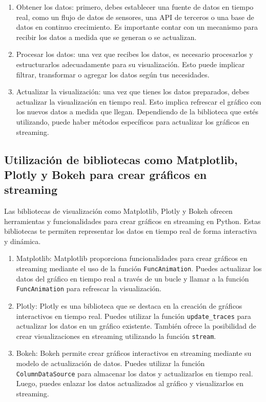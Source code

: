 \documentclass[
  a4paper,
]{article}
\begin{document}
\begin{enumerate}
\def\labelenumi{\arabic{enumi}.}
\item
  Obtener los datos: primero, debes establecer una fuente de datos en
  tiempo real, como un flujo de datos de sensores, una API de terceros o
  una base de datos en continuo crecimiento. Es importante contar con un
  mecanismo para recibir los datos a medida que se generan o se
  actualizan.
\item
  Procesar los datos: una vez que recibes los datos, es necesario
  procesarlos y estructurarlos adecuadamente para su visualización. Esto
  puede implicar filtrar, transformar o agregar los datos según tus
  necesidades.
\item
  Actualizar la visualización: una vez que tienes los datos preparados,
  debes actualizar la visualización en tiempo real. Esto implica
  refrescar el gráfico con los nuevos datos a medida que llegan.
  Dependiendo de la biblioteca que estés utilizando, puede haber métodos
  específicos para actualizar los gráficos en streaming.
\end{enumerate}

\hypertarget{utilizaciuxf3n-de-bibliotecas-como-matplotlib-plotly-y-bokeh-para-crear-gruxe1ficos-en-streaming}{%
\subsection{Utilización de bibliotecas como Matplotlib, Plotly y Bokeh
para crear gráficos en
streaming}\label{utilizaciuxf3n-de-bibliotecas-como-matplotlib-plotly-y-bokeh-para-crear-gruxe1ficos-en-streaming}}

Las bibliotecas de visualización como Matplotlib, Plotly y Bokeh ofrecen
herramientas y funcionalidades para crear gráficos en streaming en
Python. Estas bibliotecas te permiten representar los datos en tiempo
real de forma interactiva y dinámica.

\begin{enumerate}
\def\labelenumi{\arabic{enumi}.}
\item
  Matplotlib: Matplotlib proporciona funcionalidades para crear gráficos
  en streaming mediante el uso de la función \texttt{FuncAnimation}.
  Puedes actualizar los datos del gráfico en tiempo real a través de un
  bucle y llamar a la función \texttt{FuncAnimation} para refrescar la
  visualización.
\item
  Plotly: Plotly es una biblioteca que se destaca en la creación de
  gráficos interactivos en tiempo real. Puedes utilizar la función
  \texttt{update\_traces} para actualizar los datos en un gráfico
  existente. También ofrece la posibilidad de crear visualizaciones en
  streaming utilizando la función \texttt{stream}.
\item
  Bokeh: Bokeh permite crear gráficos interactivos en streaming mediante
  su modelo de actualización de datos. Puedes utilizar la función
  \texttt{ColumnDataSource} para almacenar los datos y actualizarlos en
  tiempo real. Luego, puedes enlazar los datos actualizados al gráfico y
  visualizarlos en streaming.
\end{enumerate}
\end{document}
